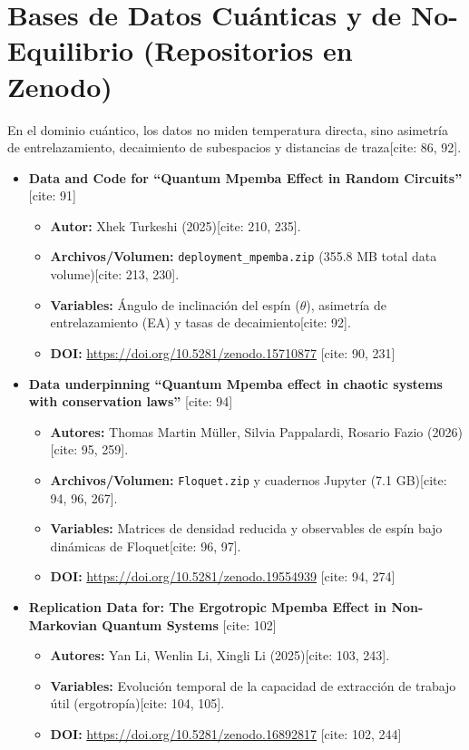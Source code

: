 \documentclass[11pt,a4paper]{article}
\begin{document}
\section{Bases de Datos Cuánticas y de No-Equilibrio (Repositorios en Zenodo)}
En el dominio cuántico, los datos no miden temperatura directa, sino asimetría de entrelazamiento, decaimiento de subespacios y distancias de traza[cite: 86, 92]. 

\begin{itemize}
    \item \textbf{Data and Code for ``Quantum Mpemba Effect in Random Circuits''} [cite: 91]
    \begin{itemize}
        \item \textbf{Autor:} Xhek Turkeshi (2025)[cite: 210, 235].
        \item \textbf{Archivos/Volumen:} \texttt{deployment\_mpemba.zip} (355.8 MB total data volume)[cite: 213, 230].
        \item \textbf{Variables:} Ángulo de inclinación del espín ($\theta$), asimetría de entrelazamiento (EA) y tasas de decaimiento[cite: 92].
        \item \textbf{DOI:} \url{https://doi.org/10.5281/zenodo.15710877} [cite: 90, 231]
    \end{itemize}

    \item \textbf{Data underpinning ``Quantum Mpemba effect in chaotic systems with conservation laws''} [cite: 94]
    \begin{itemize}
        \item \textbf{Autores:} Thomas Martin Müller, Silvia Pappalardi, Rosario Fazio (2026)[cite: 95, 259].
        \item \textbf{Archivos/Volumen:} \texttt{Floquet.zip} y cuadernos Jupyter (7.1 GB)[cite: 94, 96, 267].
        \item \textbf{Variables:} Matrices de densidad reducida y observables de espín bajo dinámicas de Floquet[cite: 96, 97].
        \item \textbf{DOI:} \url{https://doi.org/10.5281/zenodo.19554939} [cite: 94, 274]
    \end{itemize}

    \item \textbf{Replication Data for: The Ergotropic Mpemba Effect in Non-Markovian Quantum Systems} [cite: 102]
    \begin{itemize}
        \item \textbf{Autores:} Yan Li, Wenlin Li, Xingli Li (2025)[cite: 103, 243].
        \item \textbf{Variables:} Evolución temporal de la capacidad de extracción de trabajo útil (ergotropía)[cite: 104, 105].
        \item \textbf{DOI:} \url{https://doi.org/10.5281/zenodo.16892817} [cite: 102, 244]
    \end{itemize}


\end{itemize}
\end{document}
